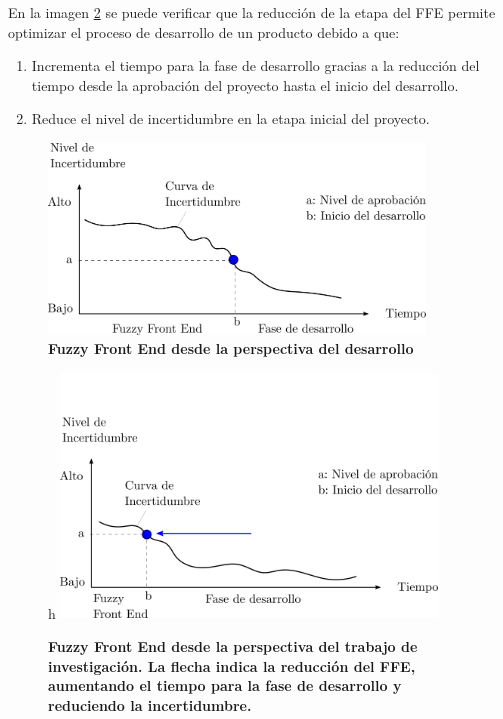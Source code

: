 En la imagen \ref{fig:fuzzy2} se puede verificar que la reducción de la etapa del FFE permite optimizar el proceso de desarrollo de un producto debido a que:
\begin{enumerate}
    \item Incrementa el tiempo para la fase de desarrollo gracias a la reducción del tiempo desde la aprobación del proyecto hasta el inicio del desarrollo.
    \item Reduce el nivel de incertidumbre en la etapa inicial del proyecto.
\end{enumerate}



\begin{figure}
\centering
\includegraphics[width=10cm]{Img/CPD/fuzzy0.png}
\caption{\textbf{\footnotesize{Fuzzy Front End desde la perspectiva del desarrollo}}}
\label{fig:fuzzy3}
\end{figure}


\begin{figure}{h}
\centering
\includegraphics[width=10cm]{Img/CPD/cpd-fuzzy1-margin.png}
\caption{\textbf{\footnotesize{Fuzzy Front End desde la perspectiva del trabajo de investigación. La flecha indica la reducción del FFE, aumentando el tiempo para la fase de desarrollo y reduciendo la incertidumbre.}}}
\label{fig:fuzzy2}
\end{figure}


